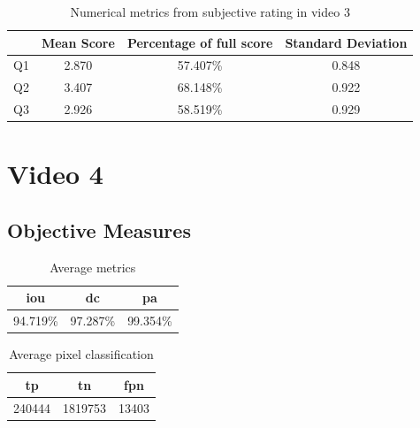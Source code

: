 \begin{table}[H]
    \centering
    \begin{tabular}{|c|c c c|} 
        \hline
           & \textbf{Mean Score} & \textbf{Percentage of full score} & \textbf{Standard Deviation} \\ [0.5ex] 
        \hline
        Q1 & 2.870 & 57.407\% & 0.848 \\ [1ex] 
        Q2 & 3.407 & 68.148\% & 0.922 \\ [1ex] 
        Q3 & 2.926 & 58.519\% & 0.929 \\ [1ex] 
        \hline
    \end{tabular}
    \caption{Numerical metrics from subjective rating in video 3}
    \label{tab:numerical_subj_vid3}
\end{table}





\section{Video 4}
\subsection{Objective Measures}

\begin{minipage}[c]{0.475\textwidth}
\begin{table}[H]
    \centering
    \begin{tabular}{||c c c||} 
        \hline
        \acrshort{iou} & \acrshort{dc} & \acrshort{pa} \\ [0.5ex] 
        \hline\hline
        94.719\% & 97.287\% & 99.354\% \\ [1ex] 
        \hline
    \end{tabular}
    \caption{Average metrics}
    \label{tab:metrics_video_4}
\end{table}
\end{minipage}
\begin{minipage}[c]{0.475\textwidth}
\begin{table}[H]
    \centering
    \begin{tabular}{||c c c||} 
        \hline
        \acrshort{tp} & \acrshort{tn} & \acrshort{fpn} \\ [0.5ex] 
        \hline\hline
        240444 & 1819753 & 13403 \\ [1ex] 
        \hline
    \end{tabular}
    \caption{Average pixel classification}
    \label{tab:pixels_video_4}
\end{table}
\end{minipage}

